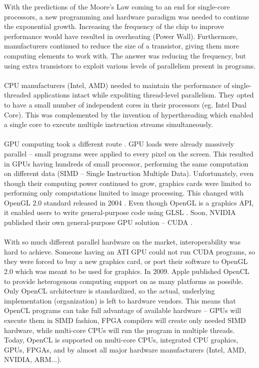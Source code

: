 With the predictions of the Moore's Law \cite{moore1965cramming} coming to an end for single-core processors, a new programming and hardware paradigm was needed to continue the exponential growth. Increasing the frequency of the chip to improve performance would have resulted in overheating (Power Wall). Furthermore, manufacturers continued to reduce the size of a transistor, giving them more computing elements to work with. The answer was reducing the frequency, but using extra transistors to exploit various levels of parallelism present in programs.\\
\\
CPU manufacturers (Intel, AMD) needed to maintain the performance of single-threaded applications intact while expoliting thread-level parallelism. They opted to have a small number of independent cores in their processors (eg. Intel Dual Core). This was complemented by the invention of hyperthreading \cite{marr2002hyper} which enabled a single core to execute multiple instruction streams simultaneously.\\
\\
GPU computing took a different route \cite{mcclanahan2010history}. GPU loads were already massively parallel -- small programs were applied to every pixel on the screen. This resulted in GPUs having hundreds of small processor, performing the same computation on different data (SIMD -- Single Instruction Multiple Data). Unfortunately, even though their computing power continued to grow, graphics cards were limited to performing only computations limited to image processing. This changed with OpenGL 2.0 standard released in 2004 \cite{segal2004opengl}. Even though OpenGL is a graphics API, it enabled users to write general-purpose code using GLSL \cite{kessenich2004opengl}. Soon, NVIDIA published their own general-purpose GPU solution -- CUDA \cite{nvidia2007nvidia}.\\
\\
With so much different parallel hardware on the market, interoperability was hard to achieve. Someone having an ATI GPU could not run CUDA programs, so they were forced to buy a new graphics card, or port their software to OpenGL 2.0 which was meant to be used for graphics. In 2009. Apple published OpenCL to provide heterogenous computing support on as many platforms as possible. Only OpenCL architecture is standardized, so the actual, underlying implementation (organization) is left to hardware vendors. This means that OpenCL programs can take full advantage of available hardware -- GPUs will execute them in SIMD fashion, FPGA compilers will create only needed SIMD hardware, while multi-core CPUs will run the program in multiple threads. Today, OpenCL is supported on multi-core CPUs, integrated CPU graphics, GPUs, FPGAs, and by almost all major hardware manufacturers (Intel, AMD, NVIDIA, ARM...).


